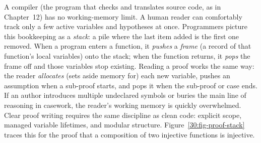 A compiler (the program that checks and translates source code, as in Chapter~12) has no working-memory limit. A human reader can comfortably track only a few active variables and hypotheses at once. Programmers picture this bookkeeping as a \emph{stack}: a pile where the last item added is the first one removed. When a program enters a function, it \emph{pushes} a \emph{frame} (a record of that function's local variables) onto the stack; when the function returns, it \emph{pops} the frame off and those variables stop existing. Reading a proof works the same way: the reader \emph{allocates} (sets aside memory for) each new variable, pushes an assumption when a sub-proof starts, and pops it when the sub-proof or case ends. If an author introduces multiple undeclared symbols or buries the main line of reasoning in casework, the reader's working memory is quickly overwhelmed. Clear proof writing requires the same discipline as clean code: explicit scope, managed variable lifetimes, and modular structure. Figure~\ref{30:fig-proof-stack} traces this for the proof that a composition of two injective functions is injective.

